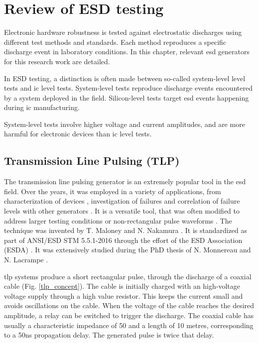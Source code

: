 \section{Review of ESD testing}
\label{sec:state-art-esd-testing}

Electronic hardware robustness is tested against electrostatic discharges using different test methods and standards.
Each method reproduces a specific discharge event in laboratory conditions.
In this chapter, relevant \gls{esd} generators for this research work are detailed.

In ESD testing, a distinction is often made between so-called system-level level tests and \gls{ic} level tests.
System-level tests reproduce discharge events encountered by a system deployed in the field.
Silicon-level tests target \gls{esd} events happening during \gls{ic} manufacturing.

System-level tests involve higher voltage and current amplitudes, and are more harmful for electronic devices than \gls{ic} level tests.

\subsection{Transmission Line Pulsing (TLP)}

The transmission line pulsing generator is an extremely popular tool in the \gls{esd} field.
Over the years, it was employed in a variety of applications, from characterization of devices \cite{TLPforESDProtectionCz, TLPthroubleshooting}, investigation of failures \cite{tlp-application-1, tlp-application-2} and correlation of failure levels with other generators \cite{correlation-system-level-esd-tlp}.
It is a versatile tool, that was often modified to address larger testing conditions \cite{tlp-power} or non-rectangular pulse waveforms \cite{tlp-based-hmm, my-publi-tlp-hmm}.
The technique was invented by T. Maloney and N. Nakamura \cite{TLP}.
It is standardized as part of ANSI/ESD STM 5.5.1-2016 \cite{tlp-standard} through the effort of the ESD Association (ESDA) \cite{esda}.
It was extensively studied during the PhD thesis of N. Monnereau \cite{phd-monnereau} and N. Lacrampe \cite{phd-lacrampe}.

\gls{tlp} systems produce a short rectangular pulse, through the discharge of a coaxial cable (Fig. \ref{tlp_concept}).
The cable is initially charged with an high-voltage voltage supply through a high value resistor.
This keeps the current small and avoids oscillations on the cable.
When the voltage of the cable reaches the desired amplitude, a relay can be switched to trigger the discharge.
The coaxial cable has usually a characteristic impedance of 50\textOmega{} and a length of 10 metres, corresponding to a 50ns propagation delay.
The generated pulse is twice that delay.

